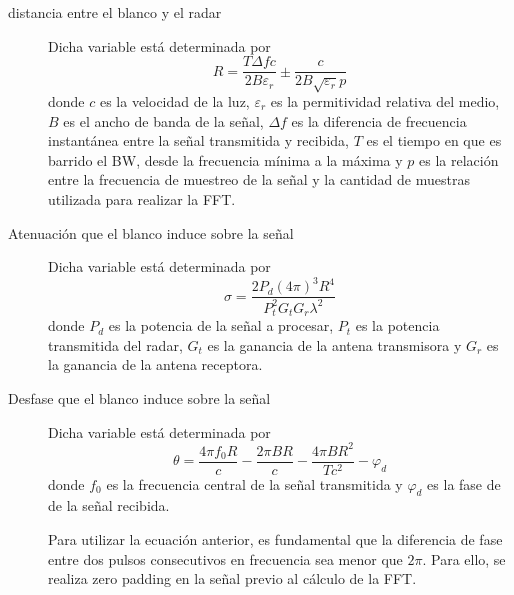 \begin{description}

\item[distancia entre el blanco y el radar]
Dicha variable está determinada por
\begin{equation}
  R = \dfrac{T\Delta fc}{2B\varepsilon_r} \pm \dfrac{c}{2B\sqrt{\varepsilon_r}p}
\end{equation}
donde $c$ es la velocidad de la luz, $\varepsilon_r$ es la permitividad relativa del medio, $B$ es el ancho de banda de la señal, $\Delta f$ es la diferencia de frecuencia instantánea entre la señal transmitida y recibida, $T$ es el tiempo en que es barrido el BW, desde la frecuencia mínima a la máxima y $p$ es la relación entre la frecuencia de muestreo de la señal y la cantidad de muestras utilizada para realizar la FFT.

\item[Atenuación que el blanco induce sobre la señal]
Dicha variable está determinada por
\begin{equation}
  \sigma = \dfrac{2P_d(4\pi)^3 R^4}{P_t^2G_tG_r\lambda^2}
\end{equation}
donde $P_d$ es la potencia de la señal a procesar, $P_t$ es la potencia transmitida del radar, $G_t$ es la ganancia de la antena transmisora y $G_r$ es la ganancia de la antena receptora.

\item[Desfase que el blanco induce sobre la señal]
Dicha variable está determinada por
\begin{equation}
  \theta = \dfrac{4\pi f_0R}{c} - \dfrac{2\pi BR}{c} - \dfrac{4\pi BR^2}{Tc^2} - \varphi_d
\end{equation}
donde $f_0$ es la frecuencia central de la señal transmitida y $\varphi_d$ es la fase de de la señal recibida.

Para utilizar la ecuación anterior, es fundamental que la diferencia de fase entre dos pulsos consecutivos en frecuencia sea menor que $2\pi$. Para ello, se realiza zero padding en la señal previo al cálculo de la FFT.
\end{description}